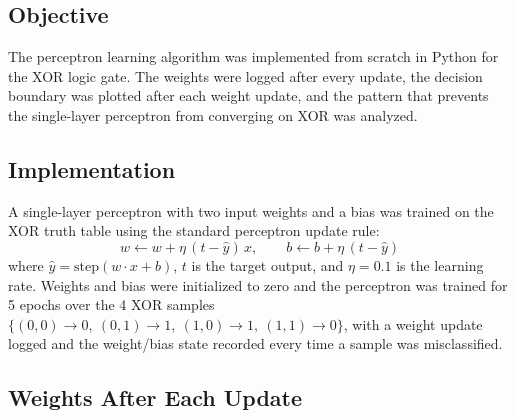 \documentclass[11pt]{article}
\begin{document}
\subsection*{Objective}
The perceptron learning algorithm was implemented from scratch in Python for
the XOR logic gate. The weights were logged after every update, the decision
boundary was plotted after each weight update, and the pattern that prevents
the single-layer perceptron from converging on XOR was analyzed.

\subsection*{Implementation}
A single-layer perceptron with two input weights and a bias was trained on the
XOR truth table using the standard perceptron update rule:
\begin{equation}
    w \leftarrow w + \eta\,(t - \hat{y})\,x, \qquad b \leftarrow b + \eta\,(t - \hat{y})
\end{equation}
where $\hat{y} = \mathrm{step}(w \cdot x + b)$, $t$ is the target output, and
$\eta = 0.1$ is the learning rate. Weights and bias were initialized to zero
and the perceptron was trained for 5 epochs over the 4 XOR samples
$\{(0,0){\to}0,\ (0,1){\to}1,\ (1,0){\to}1,\ (1,1){\to}0\}$, with a weight
update logged and the weight/bias state recorded every time a sample was
misclassified.

\subsection*{Weights After Each Update}
\end{document}
